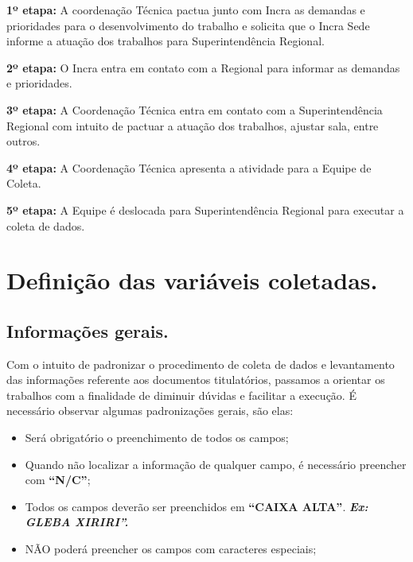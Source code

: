 \documentclass[
  letterpaper,
]{report}
\providecommand{\tightlist}{%
  \setlength{\itemsep}{0pt}\setlength{\parskip}{0pt}}\usepackage{longtable,booktabs,array}
\begin{document}
\textbf{1º etapa:} A coordenação Técnica pactua junto com Incra as
demandas e prioridades para o desenvolvimento do trabalho e solicita que
o Incra Sede informe a atuação dos trabalhos para Superintendência
Regional.

\textbf{2º etapa:} O Incra entra em contato com a Regional para informar
as demandas e prioridades.

\textbf{3º etapa:} A Coordenação Técnica entra em contato com a
Superintendência Regional com intuito de pactuar a atuação dos
trabalhos, ajustar sala, entre outros.

\textbf{4º etapa:} A Coordenação Técnica apresenta a atividade para a
Equipe de Coleta.

\textbf{5º etapa:} A Equipe é deslocada para Superintendência Regional
para executar a coleta de dados.


\hypertarget{definiuxe7uxe3o-das-variuxe1veis-coletadas.}{%
\chapter{Definição das variáveis
coletadas.}\label{definiuxe7uxe3o-das-variuxe1veis-coletadas.}}

\hypertarget{informauxe7uxf5es-gerais.}{%
\section{Informações gerais.}\label{informauxe7uxf5es-gerais.}}

Com o intuito de padronizar o procedimento de coleta de dados e
levantamento das informações referente aos documentos titulatórios,
passamos a orientar os trabalhos com a finalidade de diminuir dúvidas e
facilitar a execução. É necessário observar algumas padronizações
gerais, são elas:

\begin{itemize}
\tightlist
\item
  Será obrigatório o preenchimento de todos os campos;
\item
  Quando não localizar a informação de qualquer campo, é necessário
  preencher com \textbf{``N/C''};
\item
  Todos os campos deverão ser preenchidos em \textbf{``CAIXA ALTA''}.
  \emph{\textbf{Ex: GLEBA XIRIRI''.}}
\item
  NÃO poderá preencher os campos com caracteres especiais;
\end{itemize}
\end{document}
